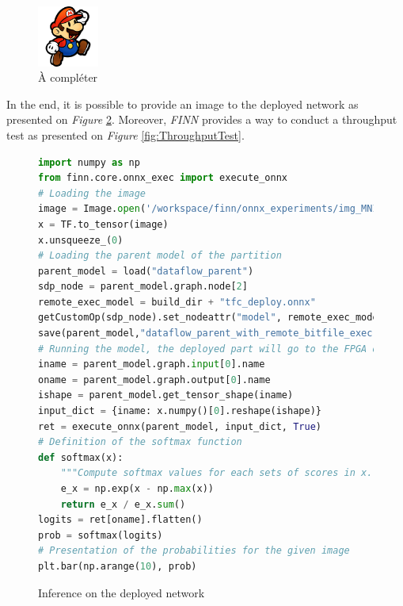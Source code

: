 \begin{figure}[htbp]
	\centering
		\includegraphics[width=2cm]{Figures/Default.png}
	\caption[ToDo]{\`A compléter}
	\label{fig:PYNQ-Z1}
\end{figure}


In the end, it is possible to provide an image to the deployed network as presented on \emph{Figure} \ref{fig:DeployedInference}. Moreover, \emph{FINN} provides a way to conduct a throughput test as presented on \emph{Figure} \ref{fig:ThroughputTest}.

\begin{figure}[htbp]
\centering
\begin{lstlisting}[language=Python]
import numpy as np
from finn.core.onnx_exec import execute_onnx
# Loading the image
image = Image.open('/workspace/finn/onnx_experiments/img_MNIST.png')
x = TF.to_tensor(image)
x.unsqueeze_(0)
# Loading the parent model of the partition
parent_model = load("dataflow_parent")
sdp_node = parent_model.graph.node[2]
remote_exec_model = build_dir + "tfc_deploy.onnx"
getCustomOp(sdp_node).set_nodeattr("model", remote_exec_model)
save(parent_model,"dataflow_parent_with_remote_bitfile_exec")
# Running the model, the deployed part will go to the FPGA once the node is reached
iname = parent_model.graph.input[0].name
oname = parent_model.graph.output[0].name
ishape = parent_model.get_tensor_shape(iname)
input_dict = {iname: x.numpy()[0].reshape(ishape)}
ret = execute_onnx(parent_model, input_dict, True)
# Definition of the softmax function
def softmax(x):
    """Compute softmax values for each sets of scores in x."""
    e_x = np.exp(x - np.max(x))
    return e_x / e_x.sum()
logits = ret[oname].flatten()
prob = softmax(logits)
# Presentation of the probabilities for the given image
plt.bar(np.arange(10), prob)
\end{lstlisting}
\caption[Deployed Inference]{Inference on the deployed network}
  \label{fig:DeployedInference}
\end{figure}

